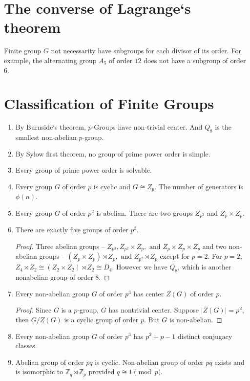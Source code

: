 \section{The converse of Lagrange`s theorem} Finite group $G$ not necessarity have subgroups for each divisor of its order.
	For example, the alternating group $A_5$ of order $12$ does not have a subgroup of order $6$.

\section{Classification of Finite Groups}
\begin{enumerate}
	\item By Burnside`s theorem, $p$-Groups have non-trivial center. And $Q_8$ is the smallest non-abelian $p$-group.
	\item By Sylow first theorem, no group of prime power order is simple.
	\item Every group of prime power order is solvable.
	\item Every group $G$ of order $p$ is cyclic and $G \cong Z_p$. The number of generators is $\phi(n)$.
	\item Every group $G$ of order $p^2$ is abelian. There are two groups $Z_{p^2}$ and $Z_p \times Z_p$.
	\item There are exactly five groups of order $p^3$.
	\begin{proof}
		Three abelian groups -- $Z_{p^3}, Z_{p^2} \times Z_p, \text{ and } Z_p \times Z_p \times Z_p$ and two non-abelian groups -- $(Z_p \times Z_p) \rtimes Z_p, \text{ and } Z_{p^2} \rtimes Z_p$ except for $p =2$. For $p=2$, $Z_4 \rtimes Z_2 \cong (Z_2 \times Z_2) \rtimes Z_2 \cong D_4$. However we have $Q_8$, which is another nonabelian group of order $8$.
	\end{proof}
	\item Every non-abelian group $G$ of order $p^3$ has center $Z(G)$ of order $p$.
	\begin{proof}
		Since $G$ is a $p$-group, $G$ has nontrivial center. Suppose $|Z(G)| = p^2$, then $G/Z(G)$ is a cyclic group of order $p$. But $G$ is non-abelian.
	\end{proof}
	\item Every non-abelian group $G$ of order $p^3$ has $p^2+p-1$ distinct conjugacy classes.
	\item Abelian group of order $pq$ is cyclic. Non-abelian group of order $pq$ exists and is isomorphic to $\mathbb{Z}_q \rtimes \mathbb{Z}_p$ provided $q \cong 1 \pmod{p}$.

\end{enumerate}
